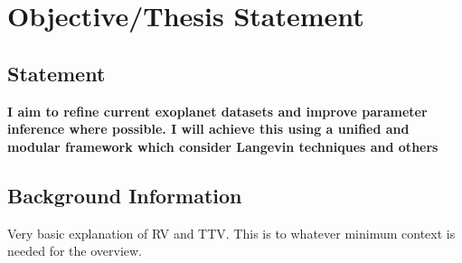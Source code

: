 \section{Objective/Thesis Statement}
\subsection{Statement}
\textbf{I aim to refine current exoplanet datasets and improve parameter inference where possible. I will achieve this using a unified and modular framework which consider Langevin techniques and others}

\subsection{Background Information}
Very basic explanation of RV and TTV. This is to whatever minimum context is needed for the overview.
